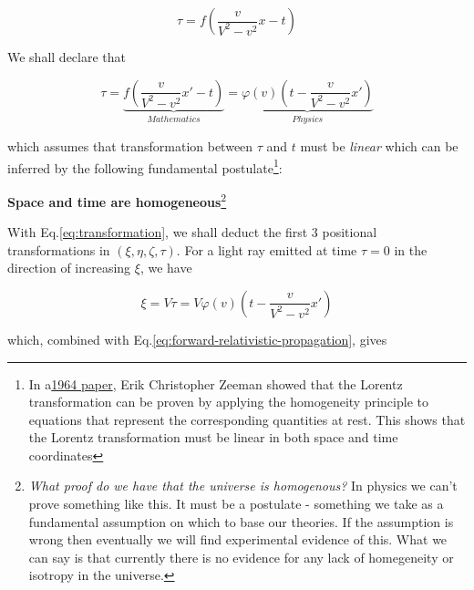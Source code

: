 \begin{equation}
    \tau = f\left( \frac{v}{V^2 - v^2} x - t \right)
\end{equation}

We shall declare that

\begin{equation}\label{eq:transformation}
\tau = \underbrace{f\left( \frac{v}{V^2 - v^2} x' - t \right)}_{Mathematics} = \underbrace{\varphi(v)\left( t - \frac{v}{V^2 - v^2} x' \right)}_{Physics}
\end{equation}

which assumes that transformation between $\tau$ and $t$ must be \textit{linear} which can be inferred by the
following fundamental postulate\footnote{In a\href{https://download.wpsoftware.net/causality-lorentz-group-zeeman.pdf}{1964 paper}, Erik Christopher Zeeman showed that the Lorentz transformation can be proven by applying the homogeneity principle to equations that represent the corresponding quantities at rest. This shows that the Lorentz transformation must be linear in both space and time coordinates}:

\begin{tcolorbox}[
    enhanced,frame hidden,boxrule=0pt,interior style={top color=green!10!white,
    bottom color=green!10!white,middle color=green!50!yellow},
    fuzzy halo=1pt with green
]
    \begin{center}
        \textbf{Space and time are homogeneous}\footnote{\textit{What proof do we have that the universe is
        homogenous?} In physics we can't prove something like this. It must be a postulate - something we take as a
        fundamental assumption on which to base our theories. If the assumption is wrong then eventually we will find
        experimental evidence of this. What we can say is that currently there is no evidence for any lack of
        homegeneity or isotropy in the universe.}
    \end{center}
\end{tcolorbox}

With Eq.\ref{eq:transformation}, we shall deduct the first 3 positional transformations in $(\xi, \eta, \zeta, \tau)$.
For a light ray emitted at time $\tau = 0$ in the direction of increasing $\xi$, we have

\begin{equation}
    \xi = V\tau = V\varphi(v)\left( t - \frac{v}{V^2 - v^2} x' \right)
\end{equation}

which, combined with Eq.\ref{eq:forward-relativistic-propagation}, gives

